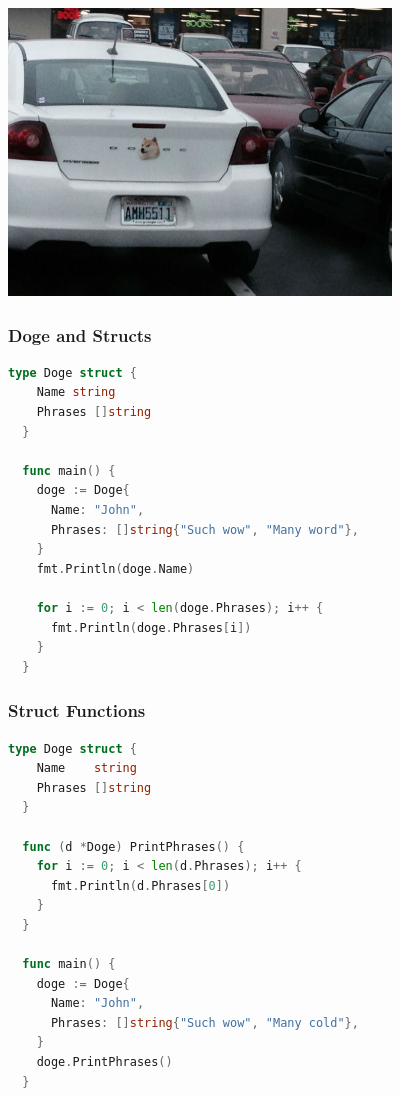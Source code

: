 \documentclass{beamer}
\begin{document}
\begin{frame}
  \includegraphics[height=3.0in]{dodge_doge}
\end{frame}

\begin{frame}[fragile]
  \frametitle{Doge and Structs}

  \begin{lstlisting}[language=go]
  type Doge struct {
    Name string
    Phrases []string
  }

  func main() {
    doge := Doge{
      Name: "John",
      Phrases: []string{"Such wow", "Many word"},
    }
    fmt.Println(doge.Name)

    for i := 0; i < len(doge.Phrases); i++ {
      fmt.Println(doge.Phrases[i])
    }
  }
  \end{lstlisting}
\end{frame}

\begin{frame}[fragile]
  \frametitle{Struct Functions}

  \begin{lstlisting}[language=go]
  type Doge struct {
    Name    string
    Phrases []string
  }

  func (d *Doge) PrintPhrases() {
    for i := 0; i < len(d.Phrases); i++ {
      fmt.Println(d.Phrases[0])
    }
  }

  func main() {
    doge := Doge{
      Name: "John",
      Phrases: []string{"Such wow", "Many cold"},
    }
    doge.PrintPhrases()
  }
  \end{lstlisting}
\end{frame}
\end{document}
